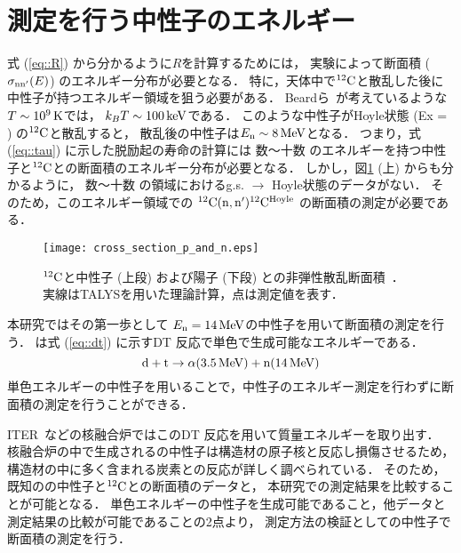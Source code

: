 \documentclass[../master]{subfiles}
\begin{document}
\section{測定を行う中性子のエネルギー}
式 (\ref{eq::R}) から分かるように$R$を計算するためには，
実験によって断面積 ($\sigma_{\rm nn'} (E)$) のエネルギー分布が必要となる．
特に，天体中で${}^{12}{\rm C}$と散乱した後に中性子が持つエネルギー領域を狙う必要がある．
Beardら~\cite{hotdensemedium}が考えているような$T\sim\SIU{e9}{\kelvin}$では，
$k_{B}T\sim\SIU{100}{\kilo\electronvolt}$である．%
このような中性子がHoyle状態 (Ex = ) の${}^{12}{\rm C}$と散乱すると，
散乱後の中性子は$E_{\rm n}\sim\SIU{8}{\mega\electronvolt}$となる．
つまり，式 (\ref{eq::tau}) に示した脱励起の寿命の計算には
数〜十数 \siu{\mega\electronvolt}のエネルギーを持つ中性子と${}^{12}{\rm C}$との断面積のエネルギー分布が必要となる．
しかし，図\ref{fig::crosssection_pres} (上) からも分かるように，
数〜十数 \siu{\mega\electronvolt}の領域におけるg.s. $\rightarrow$ Hoyle状態のデータがない．
そのため，このエネルギー領域での ${}^{12}{\rm C}({\rm n,n'}){}^{12}{\rm C}^{{\rm Hoyle}}$ の断面積の測定が必要である．
\begin{figure}
  \centering
  \texttt{[image: cross\_section\_p\_and\_n.eps]}
  \caption[${}^{12}{\rm C}$と中性子 (上段) および陽子 (下段) との非弾性散乱断面積．]
          {${}^{12}{\rm C}$と中性子 (上段) および陽子 (下段) との非弾性散乱断面積~\cite{hotdensemedium}．
  実線はTALYSを用いた理論計算，点は測定値を表す．}
  \label{fig::crosssection_pres}
\end{figure}
本研究ではその第一歩として
$E_{\rm n} = \SIU{14}{\mega\electronvolt}$の中性子を用いて断面積の測定を行う．
は式 (\ref{eq::dt}) に示すDT 反応で単色で生成可能なエネルギーである．
\begin{equation}
  {\rm d} + {\rm t} \rightarrow \alpha (\SIU{3.5}{\mega\electronvolt}) + {\rm n} (\SIU{14}{\mega\electronvolt})
  \label{eq::dt}
\end{equation}
単色エネルギーの中性子を用いることで，中性子のエネルギー測定を行わずに断面積の測定を行うことができる．

ITER~\cite{iter}などの核融合炉ではこのDT 反応を用いて質量エネルギーを取り出す．
核融合炉の中で生成されるの中性子は構造材の原子核と反応し損傷させるため，
構造材の中に多く含まれる炭素との反応が詳しく調べられている．
そのため，既知のの中性子と${}^{12}{\rm C}$との断面積のデータと，
本研究での測定結果を比較することが可能となる．
単色エネルギーの中性子を生成可能であること，他データと測定結果の比較が可能であることの2点より，
測定方法の検証としての中性子で断面積の測定を行う．
\end{document}
